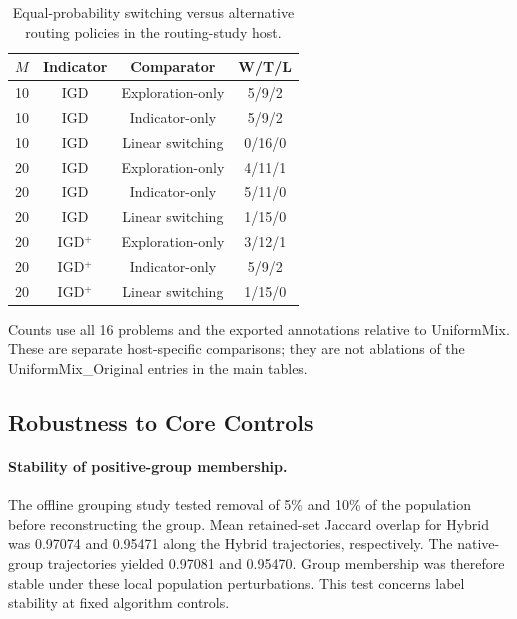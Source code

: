 \begin{table}[t]
\centering
\caption{Equal-probability switching versus alternative routing policies in the routing-study host.}
\label{tab:exp:routing}
\scriptsize
\setlength{\tabcolsep}{3pt}
\renewcommand{\arraystretch}{1.12}
\begin{tabular}{lccc}
\toprule
$M$ & Indicator & Comparator & W/T/L \\
\midrule
10 & IGD & Exploration-only & 5/9/2 \\
10 & IGD & Indicator-only & 5/9/2 \\
10 & IGD & Linear switching & 0/16/0 \\
\midrule
20 & IGD & Exploration-only & 4/11/1 \\
20 & IGD & Indicator-only & 5/11/0 \\
20 & IGD & Linear switching & 1/15/0 \\
\midrule
20 & IGD$^+$ & Exploration-only & 3/12/1 \\
20 & IGD$^+$ & Indicator-only & 5/9/2 \\
20 & IGD$^+$ & Linear switching & 1/15/0 \\
\bottomrule
\end{tabular}
\par\smallskip
\begin{minipage}{\linewidth}
\scriptsize Counts use all 16 problems and the exported annotations relative to UniformMix. These are separate host-specific comparisons; they are not ablations of the UniformMix\_Original entries in the main tables.
\end{minipage}
\end{table}


\subsection{Robustness to Core Controls}
\label{sec:exp:sensitivity}

\paragraph{Stability of positive-group membership.}
The offline grouping study tested removal of 5\% and 10\% of the
population before reconstructing the group. Mean retained-set Jaccard
overlap for Hybrid was 0.97074 and 0.95471 along the Hybrid trajectories,
respectively. The native-group trajectories yielded 0.97081 and
0.95470. Group membership was therefore stable under these local
population perturbations. This test concerns label stability at fixed
algorithm controls.

